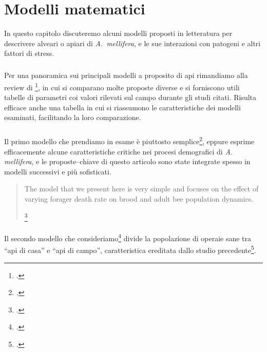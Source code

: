 \chapter{Modelli matematici}
\begin{flushright}
    \small
\end{flushright}

In questo capitolo discuteremo alcuni modelli proposti in letteratura per descrivere alveari o apiari di
\emph{A.~mellifera}, e le sue interazioni con patogeni e altri fattori di stress.

\paragraph{}
Per una panoramica sui principali modelli a proposito di api rimandiamo alla review di
\citeauthor{chen_review}\footcite{chen_review}, in cui si comparano molte proposte diverse e si forniscono utili
tabelle di parametri coi valori rilevati sul campo durante gli studi citati.
Risulta efficace anche una tabella in cui si riassumono le caratteristiche dei modelli esaminati, facilitando
la loro comparazione.

\paragraph{}
Il primo modello che prendiamo in esame è piuttosto semplice\footcite{khoury2011}, eppure esprime efficacemente alcune
caratteristiche critiche nei procesi demografici di \emph{A. mellifera}, e le proposte--chiave di questo
articolo sono state integrate spesso in modelli successivi e più sofisticati.

\blockquote[{\footcite[4]{khoury2011}}]{The model that we present here is very simple and focuses on the effect
of varying forager death rate on brood and adult bee population dynamics.}

\paragraph{}
Il secondo modello che consideriamo\footcite{ratti2017} divide la popolazione di operaie sane tra ``api di casa''
e ``api di campo'', caratteristica ereditata dallo studio precedente\footcite{khoury2011}.

